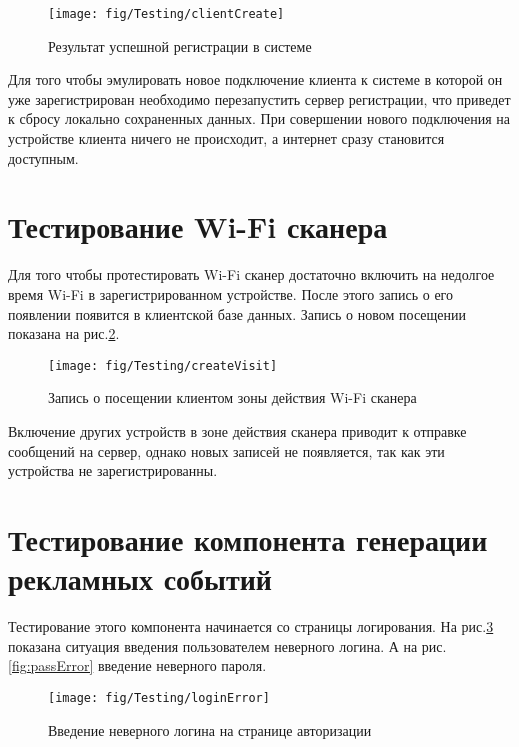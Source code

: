 \begin{figure}[h]
	\centering
	\texttt{[image: fig/Testing/clientCreate]}
	\caption{Результат успешной регистрации в системе}
	\label{fig:clientCreate}
\end{figure}

Для того чтобы эмулировать новое подключение клиента к системе в которой он уже зарегистрирован необходимо перезапустить сервер регистрации, что приведет к сбросу локально сохраненных данных. При совершении нового подключения на устройстве клиента ничего не происходит, а интернет сразу становится доступным.  

\section{Тестирование Wi-Fi сканера}

Для того чтобы протестировать Wi-Fi сканер достаточно включить на недолгое время Wi-Fi в зарегистрированном устройстве. После этого запись о его появлении появится в клиентской базе данных. Запись о новом посещении показана на рис.\ref{fig:createVisit}.

\begin{figure}[h]
	\centering
	\texttt{[image: fig/Testing/createVisit]}
	\caption{Запись о посещении клиентом зоны действия Wi-Fi сканера}
	\label{fig:createVisit}
\end{figure}

Включение других устройств в зоне действия сканера приводит к отправке сообщений на сервер, однако новых записей не появляется, так как эти устройства не зарегистрированны.

\section{Тестирование компонента генерации рекламных событий}

Тестирование этого компонента начинается со страницы логирования. На рис.\ref{fig:loginError} показана ситуация введения пользователем неверного логина. А на рис.\ref{fig:passError} введение неверного пароля.

\begin{figure}[h]
	\centering
	\texttt{[image: fig/Testing/loginError]}
	\caption{Введение неверного логина на странице авторизации}
	\label{fig:loginError}
\end{figure}

